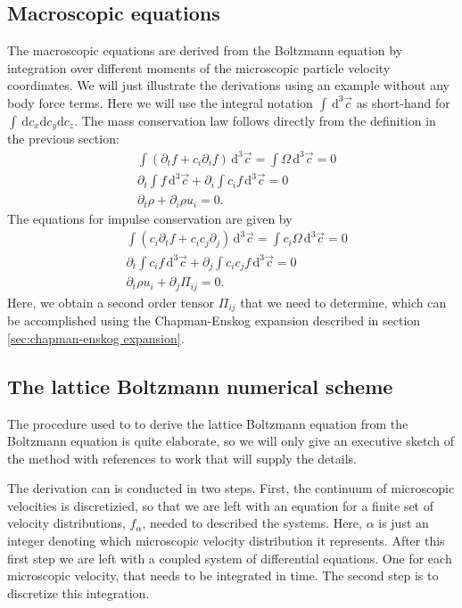 \documentclass[11pt,a4paper]{report}
\begin{document}
\subsection{Macroscopic equations}
\label{sec:macroscopic equations}
The macroscopic equations are derived from the Boltzmann equation by integration over different moments of the microscopic particle velocity coordinates. We will just illustrate the derivations using an example without any body force terms. Here we will use the integral notation $\int\,\mathrm{d}^3\vec{ c} $ as short-hand for $\int\,\mathrm{d} c_x\mathrm{d} c_y\mathrm{d} c_z$. The mass conservation law follows directly from the definition in the previous section: 
\begin{align*}
&\int \left(\partial_tf +  c_i\partial_if\right)\,\mathrm{d}^3\vec{ c} = \int \Omega\,\mathrm{d}^3\vec{ c} = 0 \\
&\partial_t\int f\,\mathrm{d}^3\vec{ c} + \partial_i\int c_i f\,\mathrm{d}^3\vec{ c} = 0 \\
&\partial_t\rho + \partial_i\rho u_i  = 0.
\end{align*}
The equations for impulse conservation are given by
\begin{align*}
&\int \left(c_i\partial_tf + c_ic_j\partial_j\right)\,\mathrm{d}^3\vec{c} = \int c_i\Omega\,\mathrm{d}^3\vec{c} = 0 \\
&\partial_t\int c_if\,\mathrm{d}^3\vec{c} + \partial_j\int c_i c_j f\,\mathrm{d}^3\vec{ c} = 0 \\
&\partial_t\rho u_i + \partial_j\Pi_{ij} = 0.
\end{align*}
Here, we obtain a second order tensor $\Pi_{ij}$ that we need to determine, which can be accomplished using the Chapman-Enskog expansion described in section \ref{sec:chapman-enskog expansion}. 

\subsection{The lattice Boltzmann numerical scheme}  
The procedure used to to derive the lattice Boltzmann equation from the Boltzmann equation is quite elaborate, so we will only give an executive sketch of the method with references to work that will supply the details.

The derivation can is conducted in two steps. First, the continuum of microscopic velocities is discretizied, so that we are left with an equation for a finite set of velocity distributions, $f_\alpha$, needed to described the systems. Here, $\alpha$ is just an integer denoting which microscopic velocity distribution it represents. After this first step we are left with a coupled system of differential equations. One for each microscopic velocity, that needs to be integrated in time. The second step is to discretize this integration.
\end{document}
